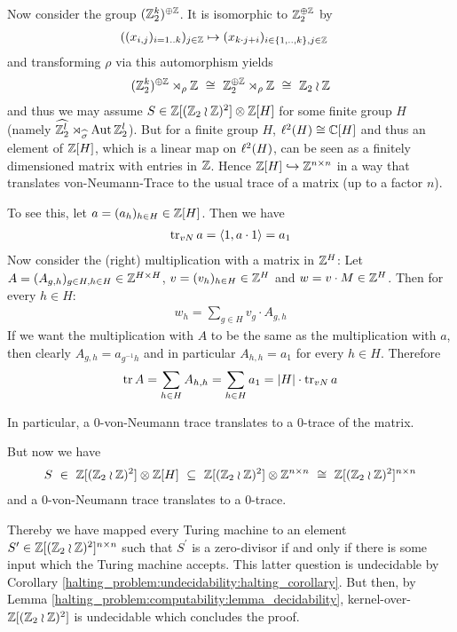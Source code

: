 	Now consider the group $(\mathbb{Z}_2^k)^{\oplus\mathbb{Z}}$. It is isomorphic to $\mathbb{Z}_2^{\oplus \mathbb{Z}}$ by
	\begin{align*}
		& ((x_{i,j})_{i = 1 .. k})_{j \in \mathbb{Z}} \mapsto (x_{k \cdot j + i})_{i \in \{1,..,k\}, j \in \mathbb{Z}}
	\end{align*}
	and transforming $\rho$ via this automorphism yields
	\begin{align*}
		(\mathbb{Z}_2^k)^{\oplus\mathbb{Z}} \rtimes_\rho \mathbb{Z} ~\cong~ \mathbb{Z}_2^{\oplus\mathbb{Z}} \rtimes_{\rho} \mathbb{Z} ~\cong~ \mathbb{Z}_2 \wr \mathbb{Z}
	\end{align*}
	and thus we may assume $S \in \mathbb{Z}[(\mathbb{Z}_2 \wr \mathbb{Z})^2] \otimes \mathbb{Z}[H]$ for some finite group $H$ (namely $\widehat{\mathbb{Z}_2^l} \rtimes_{\widehat\sigma} \operatorname{Aut} \mathbb{Z}_2^l$).
	But for a finite group $H$, $\ell^2(H) \cong \mathbb{C}[H]$ and thus an element of $\mathbb{Z}[H]$, which is a linear map on $\ell^2(H)$, can be seen as a finitely dimensioned matrix with entries in $\mathbb{Z}$.
	Hence $\mathbb{Z}[H] \hookrightarrow \mathbb{Z}^{n \times n}$ in a way that translates von-Neumann-Trace to the usual trace of a matrix (up to a factor $n$).

	To see this, let $a = (a_h)_{h \in H} \in \mathbb{Z}[H]$.
	Then we have
	\begin{align*}
		\operatorname{tr}_{vN} a = \langle 1,a \cdot 1 \rangle = a_1
	\end{align*}
	Now consider the (right) multiplication with a matrix in $\mathbb{Z}^H$:
	Let $A = (A_{g,h})_{g \in H, h \in H} \in \mathbb{Z}^{H \times H}$, $v = (v_h)_{h \in H} \in \mathbb{Z}^H$ and $w = v \cdot M \in \mathbb{Z}^H$.
	Then for every $h \in H$:
	\begin{align*}
		w_h = \sum_{g \in H} v_g \cdot A_{g,h}
	\end{align*}
	If we want the multiplication with $A$ to be the same as the multiplication with $a$, then clearly $A_{g,h} = a_{g^{-1}h}$ and in particular $A_{h,h} = a_1$ for every $h \in H$.
	Therefore
	\begin{align*}
		\operatorname{tr} A = \sum_{h \in H} A_{h,h} = \sum_{h \in H} a_1 = |H| \cdot \operatorname{tr}_{vN} a
	\end{align*}

	In particular, a $0$-von-Neumann trace translates to a $0$-trace of the matrix.

	But now we have
	\begin{align*}
		S ~\in~ \mathbb{Z}[(\mathbb{Z}_2 \wr \mathbb{Z})^2] \otimes \mathbb{Z}[H] ~\subseteq~ \mathbb{Z}[(\mathbb{Z}_2 \wr \mathbb{Z})^2] \otimes \mathbb{Z}^{n \times n} ~\cong~ \mathbb{Z}[(\mathbb{Z}_2 \wr \mathbb{Z})^2]^{n \times n}
	\end{align*}
	and a $0$-von-Neumann trace translates to a $0$-trace.

	Thereby we have mapped every Turing machine to an element $S^\prime \in \mathbb{Z}[(\mathbb{Z}_2 \wr \mathbb{Z})^2]^{n \times n}$ such that $S^\prime$ is a zero-divisor if and only if there is some input which the Turing machine accepts.
	This latter question is undecidable by Corollary \ref{halting_problem:undecidability:halting_corollary}.
	But then, by Lemma \ref{halting_problem:computability:lemma_decidability}, kernel-over-$\mathbb{Z}[(\mathbb{Z}_2 \wr \mathbb{Z})^2]$ is undecidable which concludes the proof.
\endproof

